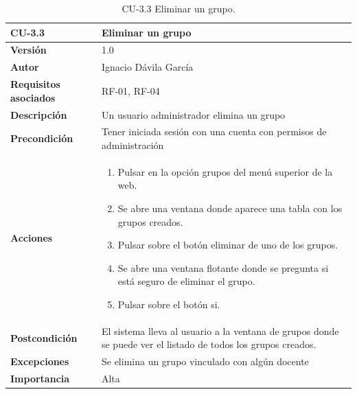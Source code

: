 \begin{table}[p]
	\centering
	\begin{tabularx}{\linewidth}{ p{} p{} }
		\toprule
		\textbf{CU-3.3}    & \textbf{Eliminar un grupo}\\
		\toprule
		\textbf{Versión}              & 1.0    \\
		\textbf{Autor}                & Ignacio Dávila García \\
		\textbf{Requisitos asociados} & RF-01, RF-04 \\
		\textbf{Descripción}          & Un usuario administrador elimina un grupo \\
		\textbf{Precondición}         & Tener iniciada sesión con una cuenta con permisos de administración \\
		\textbf{Acciones}             &
		\begin{enumerate}
			\def\labelenumi{\arabic{enumi}.}
			\tightlist
			\item Pulsar en la opción grupos del menú superior de la web.
			\item Se abre una ventana donde aparece una tabla con los grupos creados.
			\item Pulsar sobre el botón eliminar de uno de los grupos.
			\item Se abre una ventana flotante donde se pregunta si está seguro de eliminar el grupo.
			\item Pulsar sobre el botón si.
		\end{enumerate}\\
		\textbf{Postcondición}        & El sistema lleva al usuario a la ventana de grupos donde se puede ver el listado de todos los grupos creados. \\
		\textbf{Excepciones}          & Se elimina un grupo vinculado con algún docente \\
		\textbf{Importancia}          & Alta \\
		\bottomrule
	\end{tabularx}
	\caption{CU-3.3 Eliminar un grupo.}
\end{table}

